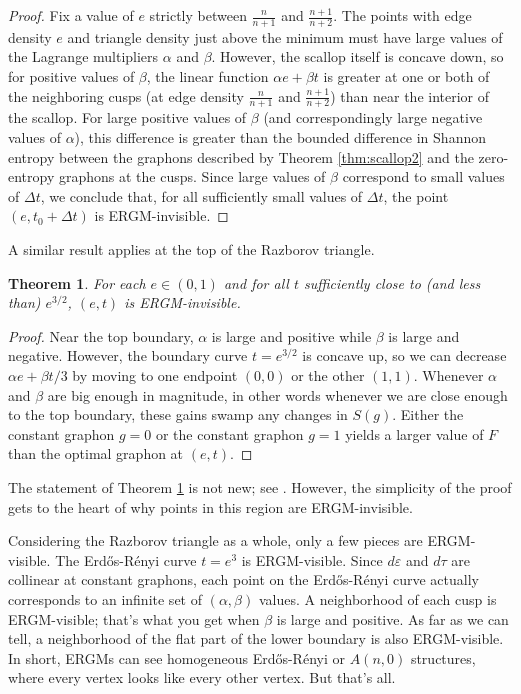 \documentclass[12pt]{amsart}
\newtheorem{theorem}[lemma]{Theorem}
\newcommand{\tdens}{\tau}
\newcommand{\edens}{\varepsilon}
\newcommand{\ER}{Erd\H{o}s-R\'enyi}
\begin{document}
{\begin{proof}
Fix a value of $e$ strictly between $\frac{n}{n+1}$ and $\frac{n+1}{n+2}$. The points with edge 
density $e$ and triangle density just above the minimum must have large values of the Lagrange 
multipliers $\alpha$ and $\beta$. However, the scallop itself is concave down, so for positive values of $\beta$, the 
linear function $\alpha e + \beta t$ is greater at one or both of the neighboring cusps 
(at edge density $\frac{n}{n+1}$ and $\frac{n+1}{n+2}$) than near the interior of the scallop. For large positive 
values of $\beta$ (and correspondingly large negative values of $\alpha$), this difference is greater than the 
bounded difference in Shannon entropy between the graphons described by Theorem \ref{thm:scallop2} and the 
zero-entropy graphons at the cusps. Since large values of $\beta$ correspond to small values of 
$\Delta t$, we conclude that, for all sufficiently small values of $\Delta t$, the point 
$(e, t_0 + \Delta t)$ is ERGM-invisible. 
\end{proof}

A similar result applies at the top of the Razborov triangle. 
\begin{theorem} \label{thm:noERGM2} 
For each $e \in (0,1)$ and for all $t$ sufficiently close to (and less than) $e^{3/2}$,
$(e,t)$ is ERGM-invisible. 
\end{theorem}

\begin{proof}
Near the top boundary,
$\alpha$ is large and positive while $\beta$ is large and negative. 
However, the boundary curve $t=e^{3/2}$ is concave up, so we can 
decrease $\alpha e + \beta t/3$ by moving to one endpoint $(0,0)$ 
or the other $(1,1)$. Whenever $\alpha$ and $\beta$ are big enough
in magnitude,
in other words whenever we are close enough to the top boundary, 
these gains swamp any changes in $S(g)$. Either
the constant graphon $g=0$ or the constant graphon $g=1$ yields a larger value of $F$ than the optimal graphon at
$(e,t)$. 
\end{proof}

The statement of Theorem \ref{thm:noERGM2} is not new; see \cite[Theorem 6.2]{CD}. However, the simplicity of the proof gets to the heart
of why points in this region are ERGM-invisible. 

Considering the Razborov triangle as a whole, only a few pieces are ERGM-visible. The \ER{} curve $t=e^3$ is 
ERGM-visible. Since $d\edens$ and $d\tdens$ are collinear at constant graphons, each point on the \ER{} 
curve actually corresponds to an infinite set of $(\alpha,\beta)$ values. A neighborhood of each cusp is ERGM-visible; that's
what you get when $\beta$ is large and positive. As far as we can tell, a neighborhood of the flat part of the lower
boundary is also ERGM-visible. In short, ERGMs can see homogeneous \ER{} or $A(n,0)$ structures, where every vertex looks like every other vertex. But that's all. 


}
\end{document}
